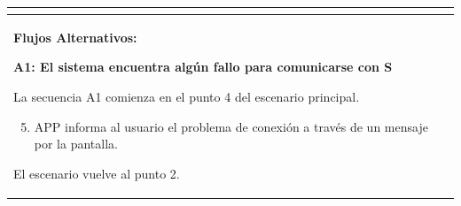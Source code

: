 \begin{longtable}{|l|p{5.5cm}|l|p{2cm}|l|p{1.9cm}|}
{				} \\ \hline

				\multicolumn{6}{|p{15cm}|}{ \textbf{Flujos Alternativos: }
				
				\textbf{A1: El sistema encuentra algún fallo para comunicarse con S}
				
				La secuencia A1 comienza en el punto 4 del escenario principal.
				\begin{enumerate}
					\setcounter{enumi}{4}
					\item APP informa al usuario el problema de conexión a través de un mensaje por la pantalla.
				\end{enumerate}

				El escenario vuelve al punto 2.

				} \\ \hline
			\end{longtable}

